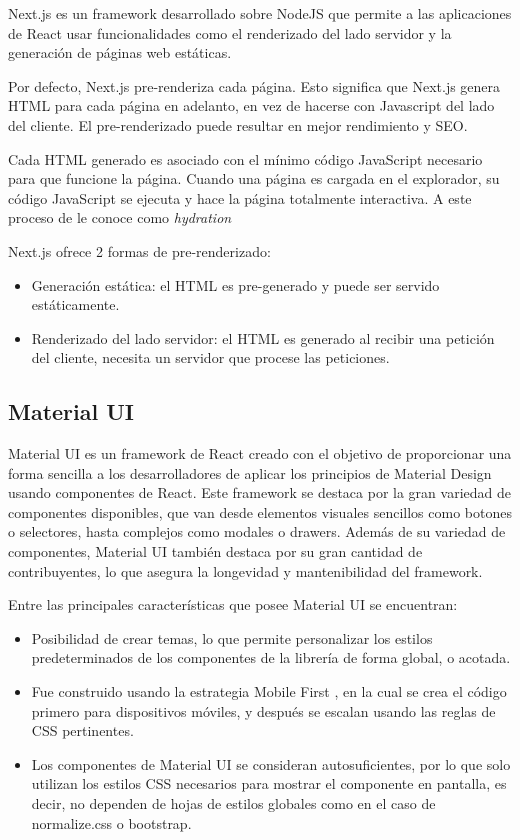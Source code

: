 Next.js es un framework desarrollado sobre NodeJS que permite a las aplicaciones de React usar funcionalidades como el renderizado del lado servidor y la generación de páginas web estáticas.

Por defecto, Next.js pre-renderiza cada página. Esto significa que Next.js genera HTML para cada página en adelanto, en vez de hacerse con Javascript del lado del cliente.  El pre-renderizado puede resultar en mejor rendimiento y SEO.

Cada HTML generado es asociado con el mínimo código JavaScript necesario para que funcione la página. Cuando una página es cargada en el explorador, su código JavaScript se ejecuta y hace la página totalmente interactiva. A este proceso de le conoce como \textit{hydration}

Next.js ofrece 2 formas de pre-renderizado:

\begin{itemize}
  \item Generación estática: el HTML es pre-generado y puede ser servido estáticamente.
  \item Renderizado del lado servidor: el HTML es generado al recibir una petición del cliente, necesita un servidor que procese las peticiones.
\end{itemize}

\subsection{Material UI}

Material UI es un framework de React creado con el objetivo de proporcionar una forma sencilla a los desarrolladores de aplicar los principios de Material Design \cite{MaterialDesignPrinciples} usando componentes de React. Este framework se destaca por la gran variedad de componentes disponibles, que van desde elementos visuales sencillos como botones o selectores, hasta complejos como modales o drawers. Además de su variedad de componentes, Material UI también destaca por su gran cantidad de contribuyentes, lo que asegura la longevidad y mantenibilidad del framework.

Entre las principales características que posee Material UI se encuentran:

\begin{itemize}
  \item Posibilidad de crear temas, lo que permite personalizar los estilos predeterminados de los componentes de la librería de forma global, o acotada.
  \item Fue construido usando la estrategia Mobile First \cite{MobileFirst}, en la cual se crea el código primero para dispositivos móviles, y después se escalan usando las reglas de CSS pertinentes.
  \item Los componentes de Material UI se consideran autosuficientes, por lo que solo utilizan los estilos CSS necesarios para mostrar el componente en pantalla, es decir, no dependen de hojas de estilos globales como en el caso de normalize.css o bootstrap.
\end{itemize}


